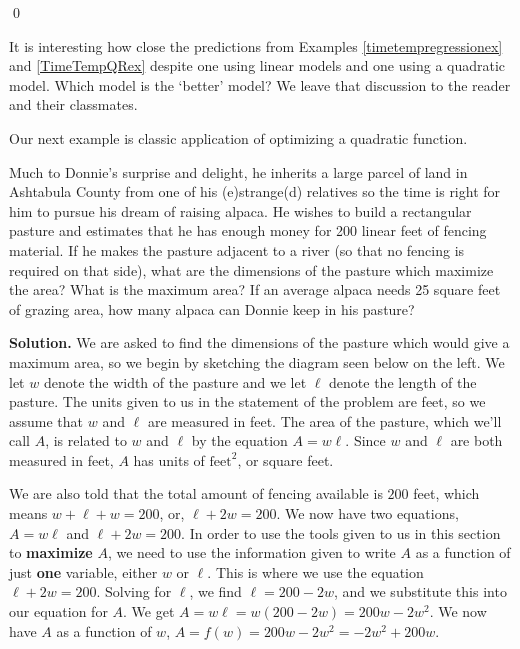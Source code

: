 \documentclass{ximera}
\begin{document}
\begin{ex}
\begin{enumerate}
\begin{center}
 \end{center}
 
 \qed
 
 \end{enumerate}
 
 \end{ex}

It is interesting how close the predictions from  Examples \ref{timetempregressionex} and  \ref{TimeTempQRex} despite one using linear models and one using a quadratic model.  Which model is the `better' model?  We leave that discussion to the reader and their classmates.

\medskip

Our next example is classic application of optimizing a quadratic function.

\begin{ex} \label{donniealpaca} Much to Donnie's surprise and delight, he inherits a large parcel of land in Ashtabula County from one of his (e)strange(d) relatives so the time is right for him to pursue his dream of raising alpaca.  He wishes to build a rectangular pasture and estimates that he has enough money for 200 linear feet of fencing material.  If he makes the pasture adjacent to a river (so that no fencing is required on that side), what are the dimensions of the pasture which maximize the area?  What is the maximum area?  If an average alpaca needs 25 square feet of grazing area, how many alpaca can Donnie keep in his pasture?

\pagebreak

{\bf Solution.} We are asked to find the dimensions of the pasture which would give a maximum area, so we begin by sketching the diagram seen below on the left.  We let $w$ denote the width of the pasture and we let $\ell$ denote the length of the pasture.  The units given to us in the statement of the problem are feet, so we assume that $w$ and $\ell$ are measured in feet.  The area of the pasture, which we'll call $A$, is related to $w$ and $\ell$ by the equation $A = w \ell$.  Since $w$ and $\ell$ are both measured in feet, $A$ has units of $\text{feet}^2$, or square feet.  

\medskip

We are also told that the total amount of fencing available is $200$ feet, which means $w + \ell + w = 200$, or, $\ell+2w = 200$.  We now have two equations, $A = w \ell$ and $\ell+2w = 200$.  In order to use the tools given to us in this section to \textbf{maximize} $A$, we need to use the information given to write $A$ as a function of just \textbf{one} variable, either $w$ or $\ell$. This is where we use the equation $\ell+2w = 200$.  Solving for $\ell$, we find $\ell = 200-2w$, and we substitute this into our equation for $A$.  We get $A = w \ell = w(200-2w) = 200w-2w^2$.  We now have $A$ as a function of $w$, $A = f(w) = 200w-2w^2 = -2w^2+200w$. 


\end{ex}
\end{document}
